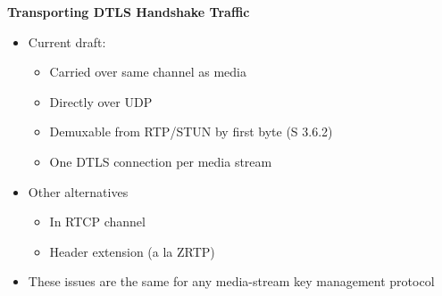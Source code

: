 \documentclass[helvetica,fancybox,landscape]{seminar}
\newcommand{\heading}[1]{%
  \begin{center} 
    \large\bf 
    #1 
  \end{center} 
  \vspace{.4 in}}
\begin{document}
\begin{slide}
\heading{Transporting DTLS Handshake Traffic}

\begin{itemize}
\item Current draft:
\begin{itemize}
\item Carried over same channel as media
\item Directly over UDP
\item Demuxable from RTP/STUN by first byte (S 3.6.2)
\item One DTLS connection per media stream
\end{itemize}
\item Other alternatives
\begin{itemize}
\item In RTCP channel
\item Header extension (a la ZRTP)
\end{itemize}
\item These issues are the same for any media-stream key management protocol
\end{itemize}
\end{slide}
\end{document}
